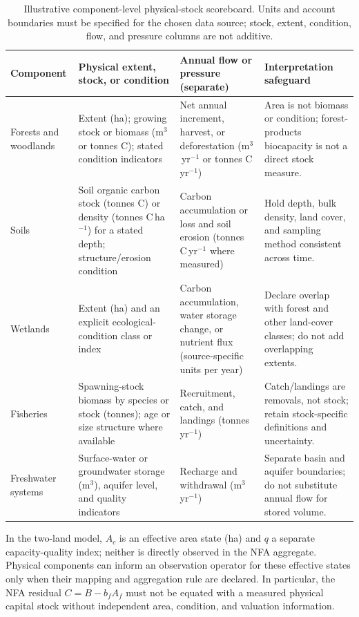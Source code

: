 \documentclass[11pt,a4paper]{article}
\begin{document}
\begin{table}[htbp]
\centering\footnotesize
\caption{Illustrative component-level physical-stock scoreboard. Units and account boundaries must be specified for the chosen data source; stock, extent, condition, flow, and pressure columns are not additive.}
\label{tab:si_stock_scoreboard}
\begin{tabularx}{\textwidth}{>{\raggedright\arraybackslash}p{} >{\raggedright\arraybackslash}p{} >{\raggedright\arraybackslash}p{} X}
\toprule
Component & Physical extent, stock, or condition & Annual flow or pressure (separate) & Interpretation safeguard \\
\midrule
Forests and woodlands & Extent (ha); growing stock or biomass (m$^3$ or tonnes C); stated condition indicators & Net annual increment, harvest, or deforestation (m$^3$\,yr$^{-1}$ or tonnes C\,yr$^{-1}$) & Area is not biomass or condition; forest-products biocapacity is not a direct stock measure. \\
Soils & Soil organic carbon stock (tonnes C) or density (tonnes C\,ha$^{-1}$) for a stated depth; structure/erosion condition & Carbon accumulation or loss and soil erosion (tonnes C\,yr$^{-1}$ where measured) & Hold depth, bulk density, land cover, and sampling method consistent across time. \\
Wetlands & Extent (ha) and an explicit ecological-condition class or index & Carbon accumulation, water storage change, or nutrient flux (source-specific units per year) & Declare overlap with forest and other land-cover classes; do not add overlapping extents. \\
Fisheries & Spawning-stock biomass by species or stock (tonnes); age or size structure where available & Recruitment, catch, and landings (tonnes\,yr$^{-1}$) & Catch/landings are removals, not stock; retain stock-specific definitions and uncertainty. \\
Freshwater systems & Surface-water or groundwater storage (m$^3$), aquifer level, and quality indicators & Recharge and withdrawal (m$^3$\,yr$^{-1}$) & Separate basin and aquifer boundaries; do not substitute annual flow for stored volume. \\
\bottomrule
\end{tabularx}
\end{table}

In the two-land model, $A_c$ is an effective area state (ha) and $q$ a separate capacity-quality index; neither is directly observed in the NFA aggregate. Physical components can inform an observation operator for these effective states only when their mapping and aggregation rule are declared. In particular, the NFA residual $C=B-b_fA_f$ must not be equated with a measured physical capital stock without independent area, condition, and valuation information.
\end{document}
